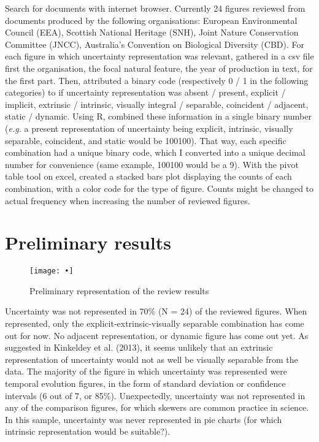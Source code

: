 \documentclass[12pt,a4paper,draft]{article}
\begin{document}
Search for documents with internet browser.
Currently 24 figures reviewed from documents produced by the following organisations: European Environmental Council (EEA), Scottish National Heritage (SNH), Joint Nature Conservation Committee (JNCC), Australia's Convention on Biological Diversity (CBD).
For each figure in which uncertainty representation was relevant, gathered in a csv file first the organisation, the focal natural feature, the year of production in text, for the first part.
Then, attributed a binary code (respectively 0 / 1 in the following categories) to if uncertainty representation was absent / present, explicit / implicit, extrinsic / intrinsic, visually integral / separable, coincident / adjacent, static / dynamic.
Using R, combined these information in a single binary number (\textit{e.g.} a present representation of uncertainty being explicit, intrinsic, visually separable, coincident, and static would be 100100).
That way, each specific combination had a unique binary code, which I converted into a unique decimal number for convenience (same example, 100100 would be a 9).
With the pivot table tool on excel, created a stacked bars plot displaying the counts of each combination, with a color code for the type of figure.
Counts might be changed to actual frequency when increasing the number of reviewed figures.

\section{Preliminary results}

\begin{figure}
\centering
\texttt{[image: •]}
\caption{Preliminary representation of the review results}
\label{prelifig}
\end{figure}

Uncertainty was not represented in 70\% (N = 24) of the reviewed figures.
When represented, only the explicit-extrinsic-visually separable combination has come out for now.
No adjacent representation, or dynamic figure has come out yet.
As suggested in Kinkeldey et al. (2013), it seems unlikely that an extrinsic representation of uncertainty would not as well be visually separable from the data.
The majority of the figure in which uncertainty was represented were temporal evolution figures, in the form of standard deviation or confidence intervals (6 out of 7, or 85\%).
Unexpectedly, uncertainty was not represented in any of the comparison figures, for which skewers are common practice in science.
In this sample, uncertainty was never represented in pie charts (for which intrinsic representation would be suitable?).
\end{document}
